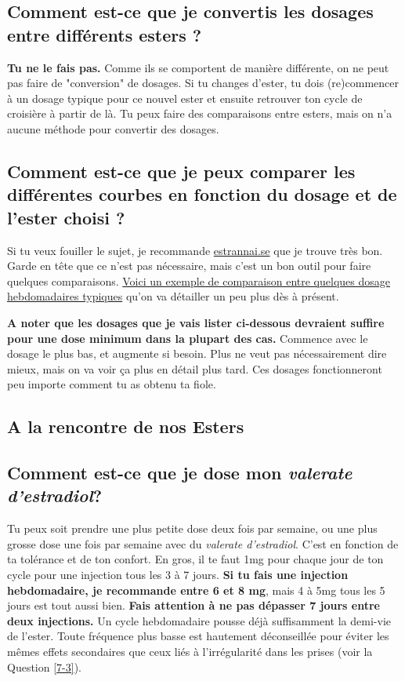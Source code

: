 \documentclass{article}
\begin{document}
\subsection{Comment est-ce que je convertis les dosages entre différents esters ?}

\textbf{Tu ne le fais pas.} Comme ils se comportent de manière différente, on ne peut pas faire de "conversion" de dosages. Si tu changes d'ester, tu dois (re)commencer à un dosage typique pour ce nouvel ester et ensuite retrouver ton cycle de croisière à partir de là. Tu peux faire des comparaisons entre esters, mais on n'a aucune méthode pour convertir des dosages.

\subsection{Comment est-ce que je peux comparer les différentes courbes en fonction du dosage et de l'ester choisi ?}

Si tu veux fouiller le sujet, je recommande \href{https://estrannai.se}{estrannai.se} que je trouve très bon. Garde en tête que ce n'est pas nécessaire, mais c'est un bon outil pour faire quelques comparaisons. \href{https://estrannai.se/\#i0__cu,7,7,1-cu,5,7,3-cu,5,7,2}{Voici un exemple de comparaison entre quelques dosage hebdomadaires typiques} qu'on va détailler un peu plus dès à présent.

\textbf{A noter que les dosages que je vais lister ci-dessous devraient suffire pour une dose minimum dans la plupart des cas.} Commence avec le dosage le plus bas, et augmente si besoin. Plus ne veut pas nécessairement dire mieux, mais on va voir ça plus en détail plus tard. Ces dosages fonctionneront peu importe comment tu as obtenu ta fiole.

\subsection*{A la rencontre de nos Esters}

\subsection{Comment est-ce que je dose mon \textit{valerate d'estradiol}?}

Tu peux soit prendre une plus petite dose deux fois par semaine, ou une plus grosse dose une fois par semaine avec du \textit{valerate d'estradiol}. C'est en fonction de ta tolérance et de ton confort. En gros, il te faut 1mg pour chaque jour de ton cycle pour une injection tous les 3 à 7 jours. \textbf{Si tu fais une injection hebdomadaire, je recommande entre 6 et 8 mg}, mais 4 à 5mg tous les 5 jours est tout aussi bien. \textbf{Fais attention à ne pas dépasser 7 jours entre deux injections.} Un cycle hebdomadaire pousse déjà suffisamment la demi-vie de l'ester. Toute fréquence plus basse est hautement déconseillée pour éviter les mêmes effets secondaires que ceux liés à l'irrégularité dans les prises (voir la Question \ref{7-3}).
\end{document}
